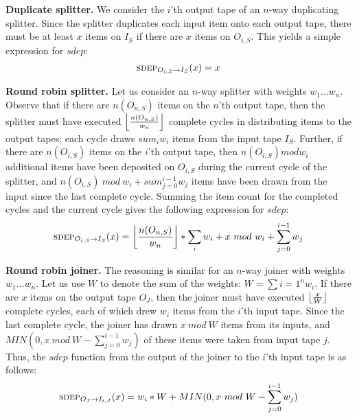{\bf Duplicate splitter.}  We consider the $i$'th output tape of an
$n$-way duplicating splitter.  Since the splitter duplicates each
input item onto each output tape, there must be at least $x$ items on
$I_S$ if there are $x$ items on $O_{i,S}$.  This yields a simple
expression for $sdep$:
\begin{align*}
\mi{I_S}{O_{i,S}}(x) = x
\end{align*}

{\bf Round robin splitter.}  Let us consider an $n$-way
splitter with weights $w_1 \dots w_n$.  Observe that if there are
$n(O_{n,S})$ items on the $n$'th output tape, then the splitter must have
executed $\left\lfloor\frac{n(O_{n,S})}{w_n}\right\rfloor$ complete cycles in distributing items
to the output tapes; each cycle draws $sum_{i}{w_i}$ items from the
input tape $I_S$.  Further, if there are $n(O_{i,S})$ items on the $i$'th
output tape, then $n(O_{i,S}) mod w_i$ additional items have been
deposited on $O_{i,S}$ during the current cycle of the splitter, and
$n(O_{i,S})~mod~w_i + sum_{j=0}^{i-1}{w_j}$ items have been drawn from
the input since the last complete cycle.  Summing the item count for
the completed cycles and the current cycle gives the following
expression for $sdep$:
\begin{align*}
\mi{I_S}{O_{i,S}}(x) = \floor{n(O_{n,S})}{w_n} * \sum_{i}{w_i} + x~mod~w_i +
\sum_{j=0}^{i-1}{w_j}
\end{align*}

{\bf Round robin joiner.}  The reasoning is similar for an
$n$-way joiner with weights $w_1 \dots w_n$.  Let us use $W$ to denote
the sum of the weights: $W = \sum{i=1}^{n}{w_i}$.  If there are $x$
items on the output tape $O_J$, then the joiner must have executed
$\left\lfloor\frac{x}{W}\right\rfloor$ complete cycles, each of which drew $w_i$ items from
the $i$'th input tape.  Since the last complete cycle, the joiner has
drawn $x~mod~W$ items from its inputs, and $MIN(0, x~mod~W -
\sum_{j=0}^{i-1}{w_j})$ of these items were taken from input tape $j$.
Thus, the $sdep$ function from the output of the joiner to the $i$'th
input tape is as follows:
\begin{align*}
\mi{I_{i,J}}{O_J}(x) = w_i * W + MIN(0, x~mod~W - \sum_{j=0}^{i-1}{w_j})
\end{align*}

